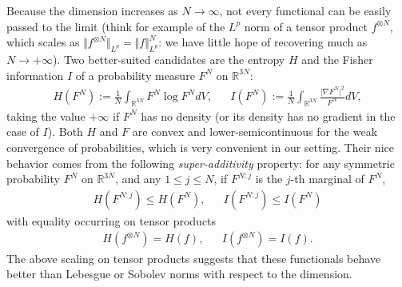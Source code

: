 \documentclass[11pt,a4paper]{article}
\theoremstyle{definition}
\theoremstyle{plain}
\begin{document}
Because the dimension increases as $N\rightarrow\infty$, not every functional can be easily passed to the limit (think for example of the $L^p$ norm of a tensor product $f^{\otimes N}$, which scales as $\Vert f^{\otimes N} \Vert_{L^p}=\Vert f \Vert_{L^p}^{N}$: we have little hope of recovering much as $N\rightarrow+\infty$). Two better-suited candidates are the entropy $H$ and the Fisher information $I$ of a probability measure $F^N$ on $\mathbb{R}^{3N}$:
\begin{align}
\label{eq:defHandI}
    H(F^N):= \frac{1}{N}\int_{\mathbb{R}^{3N}} F^N \log F^N dV,
    &&I(F^N):= \frac{1}{N}\int_{\mathbb{R}^{3N}} \frac{\vert \nabla F^N \vert^2}{F^N} dV,
\end{align}
taking the value $+\infty$ if $F^N$ has no density (or its density has no gradient in the case of $I$). Both $H$ and $F$ are convex and lower-semicontinuous for the weak convergence of probabilities, which is very convenient in our setting. Their nice behavior comes from the following \textit{super-additivity} property: for any symmetric probability $F^N$ on $\mathbb{R}^{3N}$, and any $1\leq j \leq N$, if $F^{N:j}$ is the $j$-th marginal of $F^N$,
\begin{align}
\label{eq:introsuperadditivity}
    H(F^{N:j})\leq  H(F^N), && I(F^{N:j})\leq  I(F^N)
\end{align}
with equality occurring on tensor products
\begin{align}
    H(f^{\otimes N})=H(f), && I(f^{\otimes N})=I(f).
\end{align}
The above scaling on tensor products suggests that these functionals behave better than Lebesgue or Sobolev norms with respect to the dimension.
\end{document}
